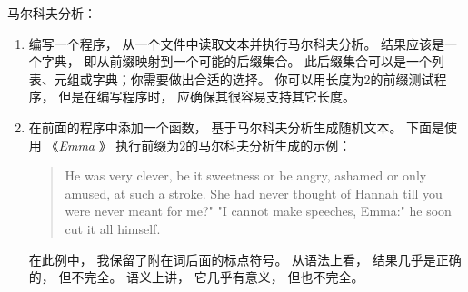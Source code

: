 \begin{exercise}
马尔科夫分析：
\begin{enumerate}

\item 编写一个程序， 从一个文件中读取文本并执行马尔科夫分析。
   结果应该是一个字典， 即从前缀映射到一个可能的后缀集合。
   此后缀集合可以是一个列表、元组或字典；你需要做出合适的选择。
   你可以用长度为2的前缀测试程序， 但是在编写程序时， 应确保其很容易支持其它长度。


\item 在前面的程序中添加一个函数， 基于马尔科夫分析生成随机文本。
   下面是使用 《{\em Emma} 》 执行前缀为2的马尔科夫分析生成的示例：

\begin{quote}
He was very clever, be it sweetness or be angry, ashamed or only
amused, at such a stroke. She had never thought of Hannah till you
were never meant for me?" "I cannot make speeches, Emma:" he soon cut
it all himself.
\end{quote}

在此例中， 我保留了附在词后面的标点符号。  从语法上看， 结果几乎是正确的， 但不完全。
语义上讲， 它几乎有意义， 但也不完全。


\end{enumerate}
\end{exercise}
